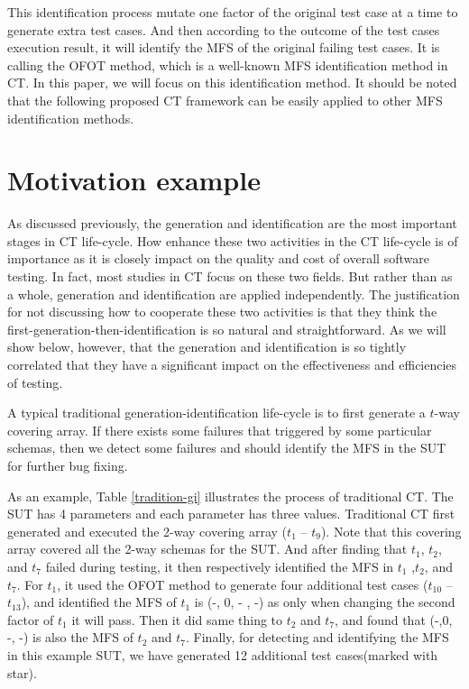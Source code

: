 \documentclass{sig-alternate}
\begin{document}
This identification process mutate one factor of the original test case at a time to generate extra test cases. And then according to the outcome of the test cases execution result, it will identify the MFS of the original failing test cases. It is calling the OFOT method, which is a well-known MFS identification method in CT. In this paper, we will focus on this identification method. It should be noted that the following proposed CT framework can be easily applied to other MFS identification methods.


\section{Motivation example}
As discussed previously, the generation and identification are the most important stages in CT life-cycle. How enhance these two activities in the CT life-cycle is of importance as it is closely impact on the quality and cost of overall software testing. In fact, most studies in CT focus on these two fields. But rather than as a whole, generation and identification are applied independently. The justification for not discussing how to cooperate these two activities is that they think the first-generation-then-identification is so natural and straightforward. As we will show below, however, that the generation and identification is so tightly correlated that they have a significant impact on the effectiveness and efficiencies of testing.

A typical traditional generation-identification life-cycle is to first generate a $t$-way covering array. If there exists some failures that triggered by some particular schemas, then we detect some failures and should identify the MFS in the SUT for further bug fixing.

As an example, Table \ref{tradition-gi} illustrates the process of traditional CT. The SUT has 4 parameters and each parameter has three values. Traditional CT first generated and executed the 2-way covering array ($t_{1}$ -- $t_{9}$). Note that this covering array covered all the 2-way schemas for the SUT. And after finding that $t_{1}$, $t_{2}$, and $t_{7}$ failed during testing, it then respectively identified the MFS in $t_{1}$ ,$t_{2}$, and $t_{7}$. For $t_{1}$, it used the OFOT method to generate four additional test cases ($t_{10}$ -- $t_{13}$), and identified the MFS of $t_{1}$ is (-, 0, - , -) as only when changing the second factor of $t_{1}$ it will pass. Then it did same thing to $t_{2}$ and $t_{7}$, and found that (-,0, -, -) is also the MFS of $t_{2}$ and $t_{7}$.  Finally, for detecting and identifying the MFS in this example SUT, we have generated 12 additional test cases(marked with star).
\end{document}
